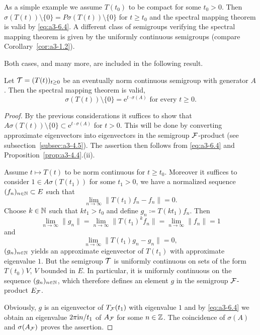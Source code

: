 As a simple example we assume $T(t_{0})$ to be compact for some $t_{0} > 0$.
Then $\sigma(T(t)) \setminus \{0\} = P\sigma(T(t)) \setminus \{0\}$ for $t \geq t_{0}$ and the spectral mapping theorem is valid by \eqref{eq:a3-6.4}.
A different class of semigroups verifying the spectral mapping theorem is given by the uniformly continuous semigroups (compare Corollary~\ref{cor:a3-1.2}).

Both cases, and many more, are included in the following result.
\begin{theorem}\label{thm:a3-6.6}%
Let $\mathcal{T} = (T(t))_{t\geq 0}$ be an eventually norm continuous semigroup with generator $A$.
Then the spectral mapping theorem is valid, \ie 
\begin{equation}\label{eq:a3-6.6)}
	\sigma(T(t)) \setminus \{0\} = \mathrm{e}^{t \cdot \sigma(A)} \text{ for every } t \geq 0 .
\end{equation}
\end{theorem}
\begin{proof}
By the previous considerations it suffices to show that $A\sigma(T(t)) \setminus \{0\} \subset \mathrm{e}^{t \cdot \sigma(A)}$ for $t > 0$.
This will be done by converting approximate eigenvectors into eigenvectors in the semigroup $\mathcal{F}$-product (see subsection~\ref{subsec:a3-4.5}).
The assertion then follows from \eqref{eq:a3-6.4} and Proposition~\ref{prop:a3-4.4}.(ii).

Assume $t \mapsto T(t)$ to be norm continuous for $t \geq t_{0}$.
Moreover it suffices to consider $1 \in A\sigma(T(t_{1}))$ for some $t_{1} > 0$, \ie we have a normalized sequence $(f_{n})_{n\in\mathbb{N}} \subset E$ such that
\[
\lim_{n\to\infty} \|T(t_{1})f_{n} - f_{n}\| = 0 .
\]
Choose $k \in \mathbb{N}$ such that $kt_{1} > t_{0}$ and define $g_{n} \coloneqq T(kt_{1})f_{n}$.
Then
\[
\lim_{n\to\infty}\|g_{n}\| = \lim_{n\to\infty}\|T(t_{1})^{k}f_{n}\| = \lim_{n\to\infty}\|f_{n}\| = 1
\]
and
\[
\lim_{n\to\infty} \|T(t_{1})g_{n} - g_{n}\| = 0 ,
\]
\ie $(g_{n})_{n\in\mathbb{N}}$ yields an approximate eigenvector of $T(t_{1})$ with approximate eigenvalue $1$.
But the semigroup $\mathcal{T}$ is uniformly continuous on sets of the form $T(t_{0})V$, $V$ bounded in $E$.
In particular, it is uniformly continuous on the sequence $(g_{n})_{n\in\mathbb{N}}$, which therefore defines an element $g$ in the semigroup $\mathcal{F}$-product $E_{\mathcal{F}}$.

Obviously, $g$ is an eigenvector of $T_{\mathcal{F}}(t_{1})$ with eigenvalue $1$ and by \eqref{eq:a3-6.4} we obtain an eigenvalue $2\pi\mathrm{i}  n/t_{1}$ of $A_{\mathcal{F}}$ for some $n \in \mathbb{Z}$.
The coincidence of $\sigma(A)$ and $\sigma(A_{\mathcal{F}})$ proves the assertion.
\end{proof}
